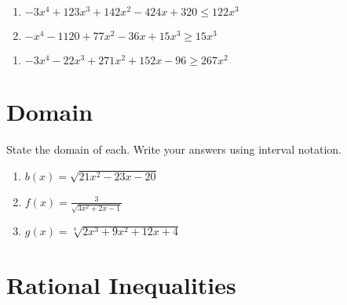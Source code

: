 \begin{multicols}{2}
\begin{enumerate}	\setcounter{enumi}{\value{Review}}
\item $-3x^4 + 123x^3 + 142x^2 - 424x + 320 \leq 122x^3$
\item $-x^4 - 1120 + 77x^2 - 36x + 15x^3 \geq 15x^3$
\end{enumerate} \setcounter{Review}{\value{enumi}}
\end{multicols}
\begin{multicols}{2}
\begin{enumerate}	\setcounter{enumi}{\value{Review}}
\item $-3x^4 - 22x^3 + 271x^2 + 152x - 96 \geq 267x^2$
\end{enumerate}
\end{multicols}

\section{Domain}

State the domain of each. Write your answers using interval notation.
\begin{enumerate}
\item $b(x) = \sqrt{21x^2 - 23x - 20}$
\item $f(x) = \frac{3}{\sqrt{3x^2 + 2x - 1}}$
\item $g(x) = \sqrt[4]{2x^3+9x^2+12x+4}$
\end{enumerate}

\section{Rational Inequalities}

